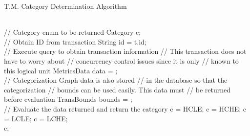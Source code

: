 \documentclass[conference]{IEEEtran}
\begin{document}
\begin{algorithm}
\caption{T.M. Category Determination Algorithm}
\label{alg:cat_for_trans}
\begin{algorithmic}[1]

    \\
    \State // Category enum to be returned
    \State Category c;
    \\
    \State // Obtain ID from transaction
    \State String id = t.id; \label{l:tid}
    \\
    \State // Execute query to obtain transaction information
    \State // This transaction does not have to worry about
    \State // concurrency control issues since it is only
    \State // known to this logical unit
    \State MetricsData data = ;\label{l:metdata}
    \\
    \State // Categorization Graph data is also stored 
    \State // in the database so that the categorization 
    \State // bounds can be used easily. This data must 
    \State // be returned before evaluation
    \State TransBounds bounds = ;\label{l:boundsdata}
    \\
    \State // Evaluate the data returned and return the category
     \label{l:start_eval}
           \State c = HCLE;
         \Else
           \State c = HCHE;
         \EndIf
    \Else
           \State c = LCLE;
         \Else
           \State c = LCHE;
         \EndIf
    \EndIf \label{l:end_eval}
    \\
    \State \Return c;
 \EndFunction

\end{algorithmic}
\end{algorithm}
\end{document}
